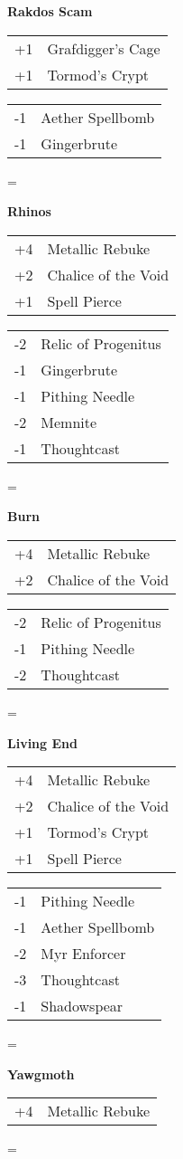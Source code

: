 \documentclass[fontsize=12pt,paper=a4]{scrartcl}
\newenvironment{absolutelynopagebreak}
  {\par\nobreak\vfil\penalty0\vfilneg
   \vtop\bgroup}
  {\par\xdef\tpd{\the\prevdepth}\egroup
   \prevdepth=\tpd}
\newenvironment{decklist}{%
    \begin{tabular}{>{\hspace{-4pt}}r<{\hspace{-3pt}}>{\hspace{-3pt}}l<{\hspace{-4pt}}}
    }{%
    \end{tabular}
    \par
}
\newcommand{\card}[2]{#1 & #2\\}
\newenvironment{sideboardguide}{%
    \newpage
    \begin{multicols}{4}
        \begin{tiny}
        }{%
        \end{tiny}
    \end{multicols}
}
\newenvironment{matchup}[1]{%
    \begin{absolutelynopagebreak}
        \textbf{#1}\par
    }{%
    \end{absolutelynopagebreak}
    \par\vspace{2em}
}
\begin{document}
\begin{sideboardguide}
\begin{matchup}{Rakdos Scam}
        \begin{decklist}
            \card{+1}{Grafdigger's Cage}
            \card{+1}{Tormod's Crypt}
        \end{decklist}
        \begin{decklist}
            \card{-1}{Aether Spellbomb}
            \card{-1}{Gingerbrute}
        \end{decklist}
    \end{matchup}
    \begin{matchup}{Rhinos}
        \begin{decklist}
            \card{+4}{Metallic Rebuke}
            \card{+2}{Chalice of the Void}
            \card{+1}{Spell Pierce}
        \end{decklist}
        \begin{decklist}
            \card{-2}{Relic of Progenitus}
            \card{-1}{Gingerbrute}
            \card{-1}{Pithing Needle}
            \card{-2}{Memnite}
            \card{-1}{Thoughtcast}
        \end{decklist}
    \end{matchup}
    \begin{matchup}{Burn}
        \begin{decklist}
            \card{+4}{Metallic Rebuke}
            \card{+2}{Chalice of the Void}
        \end{decklist}
        \begin{decklist}
            \card{-2}{Relic of Progenitus}
            \card{-1}{Pithing Needle}
            \card{-2}{Thoughtcast}
        \end{decklist}
    \end{matchup}
    \begin{matchup}{Living End}
        \begin{decklist}
            \card{+4}{Metallic Rebuke}
            \card{+2}{Chalice of the Void}
            \card{+1}{Tormod's Crypt}
            \card{+1}{Spell Pierce}
        \end{decklist}
        \begin{decklist}
            \card{-1}{Pithing Needle}
            \card{-1}{Aether Spellbomb}
            \card{-2}{Myr Enforcer}
            \card{-3}{Thoughtcast}
            \card{-1}{Shadowspear}
        \end{decklist}
    \end{matchup}
    \begin{matchup}{Yawgmoth}
        \begin{decklist}
            \card{+4}{Metallic Rebuke}

\end{decklist}
\end{matchup}
\end{sideboardguide}
\end{document}
